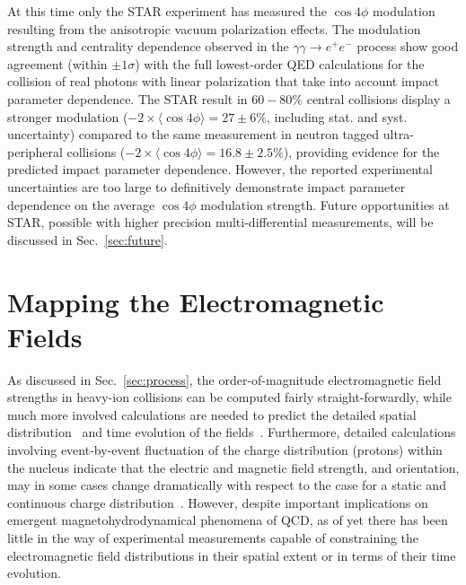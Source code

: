 \documentclass[twocolumn,epjc3]{svjour3}\sloppy
\begin{document}
At this time only the STAR experiment has measured the $\cos4\phi$ modulation~\cite{starcollaborationMeasurementMomentumAngular2021} resulting from the anisotropic vacuum polarization effects. The modulation strength and centrality dependence observed in the $\gamma\gamma \rightarrow e^+e^-$ process show good agreement (within $\pm1\sigma$) with the full lowest-order QED calculations for the collision of real photons with linear polarization that take into account impact parameter dependence. The STAR result in $60-80\%$ central collisions display a stronger modulation ($-2\times\langle\cos4\phi\rangle = 27\pm6\%$, including stat. and syst. uncertainty) compared to the same measurement in neutron tagged ultra-peripheral collisions ($-2\times\langle\cos4\phi\rangle = 16.8\pm2.5\%$), providing evidence for the predicted impact parameter dependence.
However, the reported experimental uncertainties are too large to definitively demonstrate impact parameter dependence on the average $\cos4\phi$ modulation strength. Future opportunities at STAR, possible with higher precision multi-differential measurements, will be discussed in Sec.~\ref{sec:future}.


\section{Mapping the Electromagnetic Fields}
\label{sec:mapping}
As discussed in Sec.~\ref{sec:process}, the order-of-magnitude electromagnetic field strengths in heavy-ion collisions can be computed fairly straight-forwardly, while much more involved calculations are needed to predict the detailed spatial distribution~\cite{skokovEstimateMagneticField2009} and time evolution of the fields~\cite{mclerranCommentsElectromagneticField2014,kharzeevChiralMagneticConductivity2009}.
Furthermore, detailed calculations involving event-by-event fluctuation of the charge distribution (protons) within the nucleus indicate that the electric and magnetic field strength, and orientation, may in some cases change dramatically with respect to the case for a static and continuous charge distribution~\cite{bzdakEventbyeventFluctuationsMagnetic2012}. 
However, despite important implications on emergent magnetohydrodynamical phenomena of QCD, as of yet there has been little in the way of experimental measurements capable of constraining the electromagnetic field distributions in their spatial extent or in terms of their time evolution.
\end{document}
